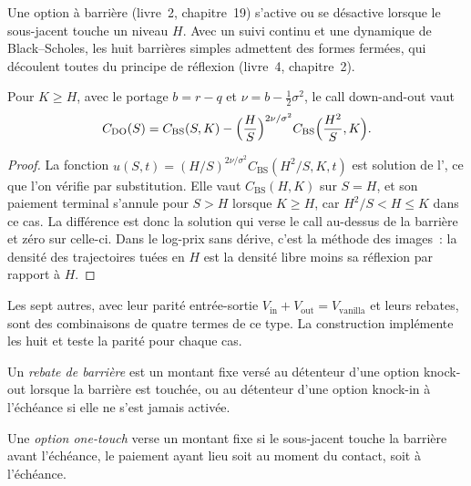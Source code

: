 Une option à barrière (livre~2, chapitre~19) s'active ou se désactive lorsque le sous-jacent touche un niveau $H$. Avec
un suivi continu et une dynamique de Black--Scholes, les huit barrières simples admettent des formes fermées, qui
découlent toutes du principe de réflexion (livre~4, chapitre~2).

\begin{proposition}\label{prop:dv:barriers-and-digitals:image}
Pour $K\ge H$, avec le portage $b=r-q$ et $\nu=b-\frac12\sigma^2$, le call down-and-out vaut
\[
C_{\mathrm{DO}}(S)=C_{\mathrm{BS}}(S,K)-\Bigl(\frac HS\Bigr)^{2\nu/\sigma^2}C_{\mathrm{BS}}\Bigl(\frac{H^2}S,K\Bigr).
\]
\end{proposition}
\begin{proof}
La fonction $u(S,t)=(H/S)^{2\nu/\sigma^2}C_{\mathrm{BS}}(H^2/S,K,t)$ est solution de l', ce
que l'on vérifie par substitution. Elle vaut $C_{\mathrm{BS}}(H,K)$ sur $S=H$, et son paiement terminal s'annule pour
$S>H$ lorsque $K\ge H$, car $H^2/S<H\le K$ dans ce cas. La différence est donc la solution qui verse le call au-dessus de la barrière
et zéro sur celle-ci. Dans le log-prix sans dérive, c'est la méthode des images~: la densité des trajectoires tuées en $H$ est la
densité libre moins sa réflexion par rapport à $H$.
\end{proof}

Les sept autres, avec leur parité entrée-sortie $V_{\mathrm{in}}+V_{\mathrm{out}}=V_{\mathrm{vanilla}}$ et leurs rebates,
sont des combinaisons de quatre termes de ce type. La construction implémente les huit et teste la parité pour chaque cas.

\begin{definition}\label{def:dv:barriers-and-digitals:rebate}
Un \emph{rebate de barrière} est un montant fixe versé au détenteur d'une option knock-out lorsque la
barrière est touchée, ou au détenteur d'une option knock-in à l'échéance si elle ne s'est jamais activée.
\end{definition}

\begin{definition}\label{def:dv:barriers-and-digitals:onetouch}
Une \emph{option one-touch} verse un montant fixe si le sous-jacent touche la barrière avant
l'échéance, le paiement ayant lieu soit au moment du contact, soit à l'échéance.
\end{definition}

